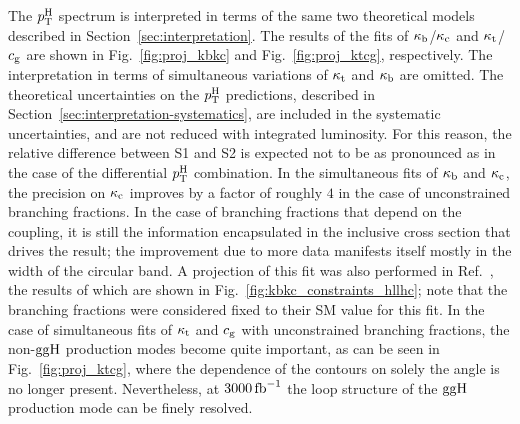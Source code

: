 The $p_\mathrm{T}^\mathrm{H}$ spectrum is interpreted in terms of the same two theoretical models described in Section~\ref{sec:interpretation}.
% 
The results of the fits of $\kappa_{\mathrm{b}}$/$\kappa_{\mathrm{c}}$ and $\kappa_{\mathrm{t}}$/$c_\mathrm{g}$ are shown in Fig.~\ref{fig:proj_kbkc} and Fig.~\ref{fig:proj_ktcg}, respectively.
% 
The interpretation in terms of simultaneous variations of $\kappa_{\mathrm{t}}$ and $\kappa_{\mathrm{b}}$ are omitted.
% 
The theoretical uncertainties on the $p_\mathrm{T}^\mathrm{H}$ predictions, described in Section~\ref{sec:interpretation-systematics}, are included in the systematic uncertainties, and are not reduced with integrated luminosity.
% 
For this reason, the relative difference between S1 and S2 is expected not to be as pronounced as in the case of the differential $p_\mathrm{T}^\mathrm{H}$ combination.
% 
In the simultaneous fits of $\kappa_{\mathrm{b}}$ and $\kappa_{\mathrm{c}}$, the precision on $\kappa_{\mathrm{c}}$ improves by a factor of roughly $4$ in the case of unconstrained branching fractions.
% 
In the case of branching fractions that depend on the coupling, it is still the information encapsulated in the inclusive cross section that drives the result; the improvement due to more data manifests itself mostly in the width of the circular band.
% 
A projection of this fit was also performed in Ref.~\cite{Bishara:2016jga}, the results of which are shown in Fig.~\ref{fig:kbkc_constraints_hllhc}; note that the branching fractions were considered fixed to their SM value for this fit.
% 
In the case of simultaneous fits of $\kappa_{\mathrm{t}}$ and $c_\mathrm{g}$ with unconstrained branching fractions, the non-$\mathrm{g}\mathrm{g}\mathrm{H}$ production modes become quite important, as can be seen in Fig.~\ref{fig:proj_ktcg}, where the dependence of the contours on solely the angle is no longer present.
% 
Nevertheless, at $3000\,\text{fb}^{-1}$ the loop structure of the $\mathrm{g}\mathrm{g}\mathrm{H}$ production mode can be finely resolved.



